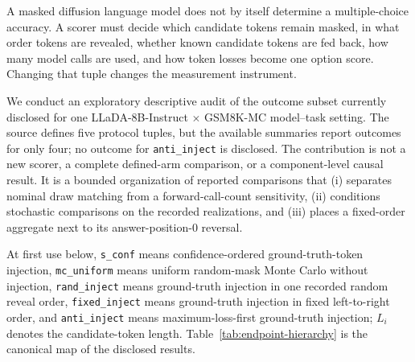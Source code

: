 \documentclass{article}
\newcommand{\sconf}{\texttt{s\_conf}}
\newcommand{\rinj}{\texttt{rand\_inject}}
\newcommand{\ainj}{\texttt{anti\_inject}}
\newcommand{\finj}{\texttt{fixed\_inject}}
\newcommand{\mcu}{\texttt{mc\_uniform}}
\begin{document}
A masked diffusion language model does not by itself determine a
multiple-choice accuracy.  A scorer must decide which candidate tokens remain
masked, in what order tokens are revealed, whether known candidate tokens are
fed back, how many model calls are used, and how token losses become one option
score.  Changing that tuple changes the measurement instrument.

We conduct an exploratory descriptive audit of the outcome subset currently
disclosed for one LLaDA-8B-Instruct $\times$ GSM8K-MC model--task setting.  The source defines
five protocol tuples, but the available summaries report outcomes for only
four; no outcome for \ainj{} is disclosed.  The contribution is not a new
scorer, a complete defined-arm comparison, or a component-level causal result.
It is a bounded organization of reported comparisons that (i) separates
nominal draw matching from a forward-call-count sensitivity, (ii) conditions
stochastic comparisons on the recorded realizations, and (iii) places a
fixed-order aggregate next to its answer-position-0 reversal.

At first use below, \sconf{} means confidence-ordered ground-truth-token
injection, \mcu{} means uniform random-mask Monte Carlo without injection,
\rinj{} means ground-truth injection in one recorded random reveal order,
\finj{} means ground-truth injection in fixed left-to-right order, and
\ainj{} means maximum-loss-first ground-truth injection; $L_i$ denotes the
candidate-token length.  Table~\ref{tab:endpoint-hierarchy}
is the canonical map of the disclosed results.
\end{document}
